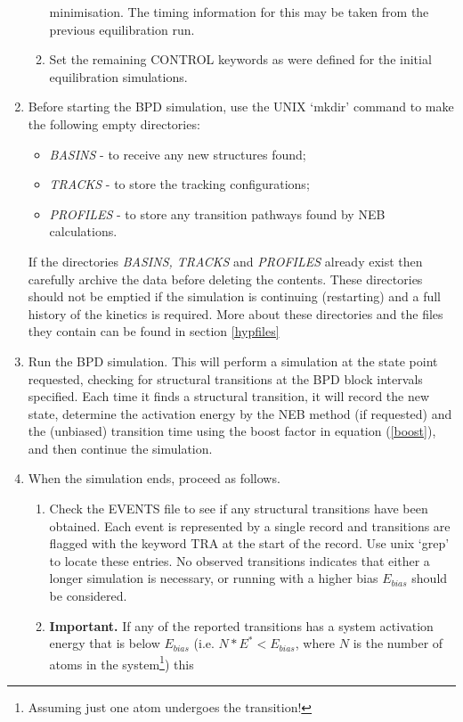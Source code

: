 \begin{enumerate}
\begin{enumerate}
      minimisation. The timing information for this may be taken from
      the previous equilibration run.
\item Set the remaining CONTROL keywords as were defined for the initial
      equilibration simulations.
\end{enumerate}
\item Before starting the BPD simulation, use the UNIX `mkdir' command to
      make the following empty directories: 
\begin{itemize}
   \item {\em BASINS} - to receive any new structures found;
   \item {\em TRACKS} - to store the tracking configurations;
   \item {\em PROFILES} - to store any transition pathways found by
   NEB calculations.
\end{itemize}
   If the directories {\em BASINS, TRACKS} and {\em PROFILES} already
   exist then carefully archive the data before deleting the
   contents. These directories should not be emptied if the simulation
   is continuing (restarting) and a full history of the kinetics is
   required. More about these directories and the files they contain
   can be found in section \ref{hypfiles}
 \item Run the BPD simulation. This will perform a simulation at the state
   point requested, checking for structural transitions at the BPD block
   intervals specified. Each time it finds a structural transition, it will
   record the new state, determine the activation energy by the NEB method (if
   requested) and the (unbiased) transition time using the boost factor in
   equation (\ref{boost}), and then continue the simulation.
\item When the simulation ends, proceed as follows.
\begin{enumerate}
\item Check the EVENTS file to see if any structural
  transitions have been obtained. Each event is represented by a
  single record and transitions are flagged with the keyword TRA at
  the start of the record. Use unix `grep' to locate these entries. No
  observed transitions indicates that either a longer simulation is
  necessary, or running with a higher bias $E_{bias}$ should be
  considered.
\item {\bf Important.} If any of the reported transitions has a system
  activation energy that is below $E_{bias}$
  (i.e. $N*E^{*}<E_{bias}$, where $N$ is the number of atoms in the
  system\footnote{Assuming just one atom undergoes the transition!}) this

\end{enumerate}
\end{enumerate}
